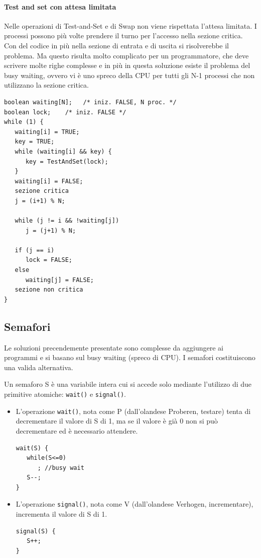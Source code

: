 \documentclass[a4paper]{article}
\begin{document}
\paragraph{Test and set con attesa limitata}
Nelle operazioni di Test-and-Set e di Swap non viene rispettata l’attesa limitata. I processi possono più volte prendere il turno per l’accesso nella sezione critica. Con del codice in più nella sezione di entrata e di uscita si risolverebbe il problema. Ma questo risulta molto complicato per un programmatore, che deve scrivere molte righe complesse e in più in questa soluzione esiste il problema del busy waiting, ovvero vi è uno spreco della CPU per tutti gli N-1 processi che non utilizzano la sezione critica.
\begin{verbatim}
boolean waiting[N];   /* iniz. FALSE, N proc. */
boolean lock;    /* iniz. FALSE */
while (1) {
   waiting[i] = TRUE;
   key = TRUE;
   while (waiting[i] && key) {
      key = TestAndSet(lock);
   }
   waiting[i] = FALSE;
   sezione critica
   j = (i+1) % N;
   
   while (j != i && !waiting[j])
      j = (j+1) % N;
   
   if (j == i)
      lock = FALSE;
   else
      waiting[j] = FALSE;
   sezione non critica
}
\end{verbatim}

\subsection{Semafori}
Le soluzioni precendemente presentate sono complesse da aggiungere ai programmi e si basano sul busy waiting (spreco di CPU). I semafori costituiscono una valida alternativa.

Un semaforo S è una variabile intera cui si accede solo mediante l'utilizzo di due primitive atomiche: \texttt{wait()} e \texttt{signal()}.
\begin{itemize}
   \item L'operazione \texttt{wait()}, nota come P (dall'olandese Proberen, testare) tenta di decrementare il valore di S di 1, ma se il valore è già 0 non si può decrementare ed è necessario attendere.
         \begin{verbatim}
wait(S) {
   while(S<=0)
      ; //busy wait
   S--;
}
\end{verbatim}
   \item L'operazione \texttt{signal()}, nota come V (dall'olandese Verhogen, incrementare), incrementa il valore di S di 1.
         \begin{verbatim}
signal(S) {
   S++;
}
\end{verbatim}
\end{itemize}
\end{document}
